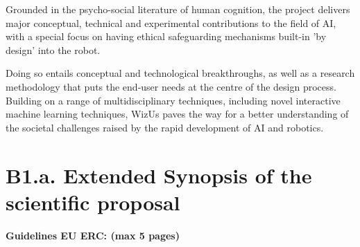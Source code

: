 \documentclass[11pt]{report}
\newcommand{\project}{WizUs\xspace}
\newcommand{\eu}[1]{{\color{teal}\textbf{Guidelines EU ERC: #1}}}
\begin{document}
Grounded in the psycho-social literature of human cognition, the project delivers
major conceptual, technical and experimental contributions to the field of AI, 
with a special focus on having ethical safeguarding mechanisms built-in 'by 
design' into the robot.

Doing so entails conceptual and technological breakthroughs, as well as a research
methodology that puts the end-user needs at the centre of the design process. 
Building on a range of multidisciplinary techniques, including novel interactive 
machine learning techniques, \project paves the way for a better understanding of 
the societal challenges raised by the rapid development of AI and robotics.

\newpage

\tableofcontents

\pagebreak


\newcommand{\wpOne}{Project management \& dissemination}
\newcommand{\wpOneShort}{\wpOne{}}

\newcommand{\wpTwo}{Framing robot-supported human-human interaction}
\newcommand{\wpTwoShort}{Framing r-HHI}


\newcommand{\wpThree}{Ethical-by-design socio-cognitive architecture for robot-supported human-human interactions}
\newcommand{\wpThreeShort}{Socio-cognitive architecture}

\newcommand{\wpFour}{Social situation assessment}
\newcommand{\wpFourShort}{\wpFour{}}

\newcommand{\wpFive}{Data-driven social behaviour generation}
\newcommand{\wpFiveShort}{Social behaviours}

\newcommand{\wpSix}{Experimental investigation}
\newcommand{\wpSixShort}{Experimental investigation}

\newcommand{\wpSeven}{TDB}
\newcommand{\wpSevenShort}{TBD}





\newrefsection

\chapter{B1.a. Extended Synopsis of the scientific proposal}\label{part1}
\eu{(max 5 pages)}
\end{document}
